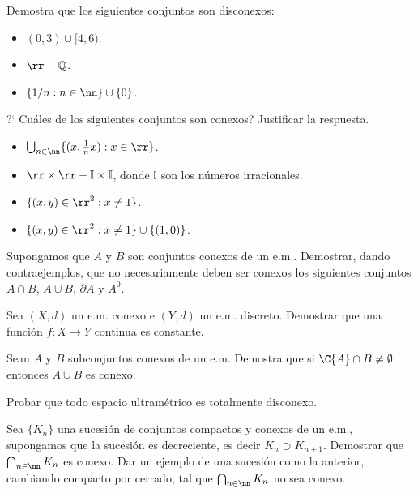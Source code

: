 \begin{ejercicio} Demostra que los siguientes conjuntos son
disconexos:
\begin{itemize}
    \item[i)] $(0,3)\cup [4,6)$.
    \item[ii)] $\rr-\mathbb{Q}$.
    \item[iii)] $\{1/n:n\in\nn\}\cup \{0\}$.
\end{itemize}
\end{ejercicio}
\begin{ejercicio} ?` Cu\'ales de los siguientes conjuntos son
conexos? Justificar la respuesta.
\begin{itemize}
    \item[i)] $\bigcup_{n\in\nn}\{(x,\frac1nx):x\in\rr\}$.
    \item[ii)] $\rr\times\rr-\mathbb{I}\times\mathbb{I}$, donde
    $\mathbb{I}$ son los n\'umeros irracionales.
    \item[iii)] $\{(x,y)\in\rr^2:x\neq 1\}$.
    \item[iv)] $\{(x,y)\in\rr^2:x\neq 1\}\cup\{(1,0)\}$.
\end{itemize}
\end{ejercicio}

\begin{ejercicio} Supongamos que  $A$ y $B$ son conjuntos conexos
de un e.m.. Demostrar, dando contraejemplos, que no necesariamente
deben ser conexos los siguientes conjuntos $A\cap B$, $A\cup B$,
$\partial A$ y $A^0$.
\end{ejercicio}

\begin{ejercicio} Sea $(X,d)$ un e.m. conexo e $(Y,d)$ un e.m. discreto.
Demostrar que una funci\'on $f:X\to Y$ continua es constante.
\end{ejercicio}

\begin{ejercicio} Sean $A$ y $B$ subconjuntos conexos de un e.m.
Demostra que si $\C{A}\cap B\neq\emptyset$ entonces $A\cup B$ es
conexo.
\end{ejercicio}

\begin{ejercicio} Probar que todo espacio ultram\'etrico es
totalmente disconexo.
\end{ejercicio}

\begin{ejercicio} Sea $\{K_n\}$ una sucesi\'on de conjuntos compactos y conexos
de un e.m., supongamos que la sucesi\'on es decreciente, es decir
$K_n\supset K_{n+1}$. Demostrar que $\bigcap_{n\in\nn} K_n$ es
conexo. Dar un ejemplo de una sucesi\'on como la anterior,
cambiando compacto por cerrado, tal que $\bigcap_{n\in\nn}K_n$ no
sea conexo.
\end{ejercicio}

